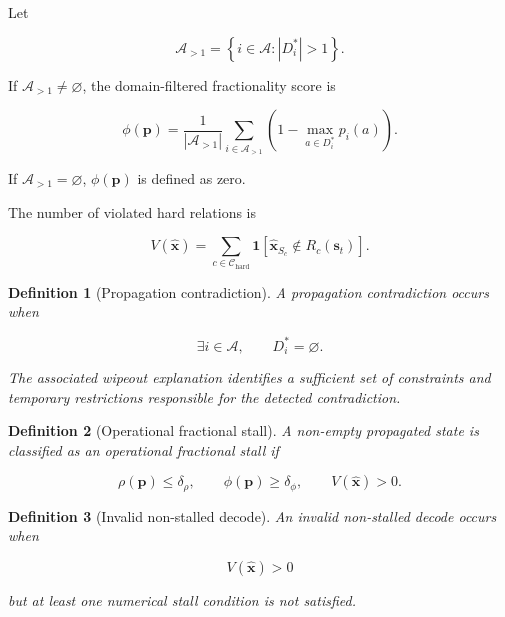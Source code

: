 \documentclass[pdflatex,sn-mathphys-num,iicol,oneside]{sn-jnl}
\newtheorem{definition}{Definition}
\begin{document}
Let

\begin{equation}
\mathcal{A}_{>1}
=
\left\{
i\in\mathcal{A}:|D_i^{*}|>1
\right\}.
\end{equation}

If $\mathcal{A}_{>1}\neq\varnothing$, the domain-filtered
fractionality score is

\begin{equation}
\phi(\bm{p})
=
\frac{1}{|\mathcal{A}_{>1}|}
\sum_{i\in\mathcal{A}_{>1}}
\left(
1-\max_{a\in D_i^{*}}p_i(a)
\right).
\label{eq:fractionality}
\end{equation}

If $\mathcal{A}_{>1}=\varnothing$, $\phi(\bm{p})$ is defined as zero.

The number of violated hard relations is

\begin{equation}
V(\widehat{\bm{x}})
=
\sum_{c\in\mathcal{C}_{\mathrm{hard}}}
\mathbf{1}
\left[
\widehat{\bm{x}}_{S_c}
\notin R_c(\bm{s}_t)
\right].
\label{eq:violations}
\end{equation}

\begin{definition}[Propagation contradiction]
A propagation contradiction occurs when

\begin{equation}
\exists i\in\mathcal{A},
\qquad
D_i^{*}=\varnothing.
\end{equation}

The associated wipeout explanation identifies a sufficient set of
constraints and temporary restrictions responsible for the detected
contradiction.
\end{definition}

\begin{definition}[Operational fractional stall]
A non-empty propagated state is classified as an operational
fractional stall if

\begin{equation}
\rho(\bm{p})\leq\delta_{\rho},
\qquad
\phi(\bm{p})\geq\delta_{\phi},
\qquad
V(\widehat{\bm{x}})>0.
\end{equation}
\end{definition}

\begin{definition}[Invalid non-stalled decode]
An invalid non-stalled decode occurs when

\begin{equation}
V(\widehat{\bm{x}})>0
\end{equation}

but at least one numerical stall condition is not satisfied.
\end{definition}
\end{document}

